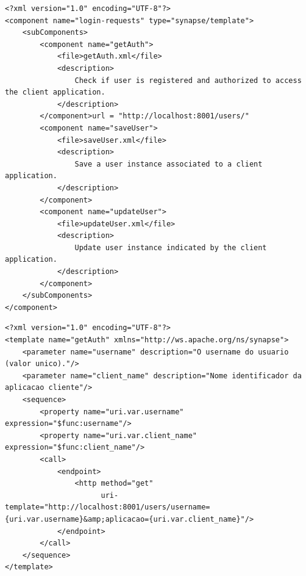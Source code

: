 \begin{apendicesenv}
\begin{lstlisting}[caption={Conteúdo do arquivo "component.xml".}]
<?xml version="1.0" encoding="UTF-8"?>
<component name="login-requests" type="synapse/template">
    <subComponents>
        <component name="getAuth">
            <file>getAuth.xml</file>
            <description>
                Check if user is registered and authorized to access the client application.
            </description>
        </component>url = "http://localhost:8001/users/"
        <component name="saveUser">
            <file>saveUser.xml</file>
            <description>
                Save a user instance associated to a client application.
            </description>
        </component>
        <component name="updateUser">
            <file>updateUser.xml</file>
            <description>
                Update user instance indicated by the client application.
            </description>
        </component>
    </subComponents>
</component>
\end{lstlisting}



\begin{lstlisting}[caption={Conteúdo do arquivo "getAuth.xml".}]
<?xml version="1.0" encoding="UTF-8"?>
<template name="getAuth" xmlns="http://ws.apache.org/ns/synapse">
    <parameter name="username" description="O username do usuario (valor unico)."/>
    <parameter name="client_name" description="Nome identificador da aplicacao cliente"/>
    <sequence>
        <property name="uri.var.username" expression="$func:username"/>
        <property name="uri.var.client_name" expression="$func:client_name"/>
        <call>
            <endpoint>
                <http method="get"
                      uri-template="http://localhost:8001/users/username={uri.var.username}&amp;aplicacao={uri.var.client_name}"/>
            </endpoint>
        </call>
    </sequence>
</template>
\end{lstlisting}



\end{apendicesenv}
